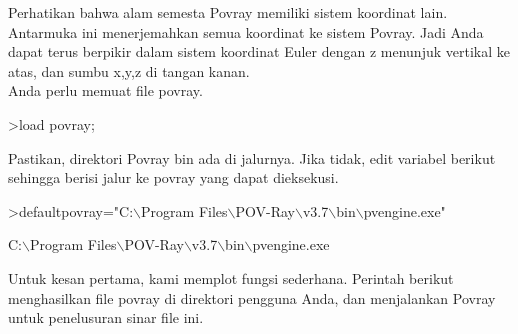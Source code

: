 \documentclass{article}
\begin{document}
\begin{eulernotebook}
\begin{eulercomment}
\begin{eulercomment}
\begin{eulercomment}
\begin{eulercomment}
\begin{eulercomment}
\begin{eulercomment}
\begin{eulercomment}
\begin{eulercomment}
\begin{eulercomment}
\begin{eulercomment}
\begin{eulercomment}
\begin{eulercomment}
\begin{eulercomment}
\begin{eulercomment}
\begin{eulercomment}
\begin{eulercomment}
\begin{eulercomment}
Perhatikan bahwa alam semesta Povray memiliki sistem koordinat lain.
Antarmuka ini menerjemahkan semua koordinat ke sistem Povray. Jadi
Anda dapat terus berpikir dalam sistem koordinat Euler dengan z
menunjuk vertikal ke atas, dan sumbu x,y,z di tangan kanan.\\
Anda perlu memuat file povray.
\end{eulercomment}
\begin{eulerprompt}
>load povray;
\end{eulerprompt}
\begin{eulercomment}
Pastikan, direktori Povray bin ada di jalurnya. Jika tidak, edit
variabel berikut sehingga berisi jalur ke povray yang dapat
dieksekusi.
\end{eulercomment}
\begin{eulerprompt}
>defaultpovray="C:\(\backslash\)Program Files\(\backslash\)POV-Ray\(\backslash\)v3.7\(\backslash\)bin\(\backslash\)pvengine.exe"
\end{eulerprompt}
\begin{euleroutput}
  C:\(\backslash\)Program Files\(\backslash\)POV-Ray\(\backslash\)v3.7\(\backslash\)bin\(\backslash\)pvengine.exe
\end{euleroutput}
\begin{eulercomment}
Untuk kesan pertama, kami memplot fungsi sederhana. Perintah berikut
menghasilkan file povray di direktori pengguna Anda, dan menjalankan
Povray untuk penelusuran sinar file ini.


\end{eulercomment}
\end{eulercomment}
\end{eulercomment}
\end{eulercomment}
\end{eulercomment}
\end{eulercomment}
\end{eulercomment}
\end{eulercomment}
\end{eulercomment}
\end{eulercomment}
\end{eulercomment}
\end{eulercomment}
\end{eulercomment}
\end{eulercomment}
\end{eulercomment}
\end{eulercomment}
\end{eulercomment}
\end{eulernotebook}
\end{document}
